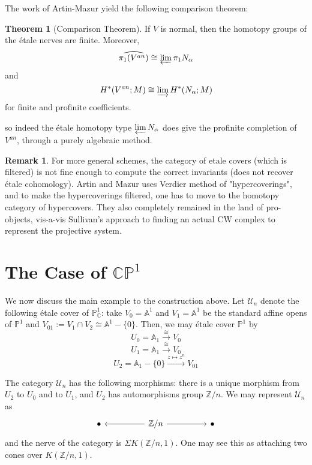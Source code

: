 \documentclass{article}
\theoremstyle{definition}
\newtheorem{theorem}{Theorem}[section]
\theoremstyle{definition}
\theoremstyle{definition}
\newtheorem{remark}{Remark}[theorem]
\theoremstyle{definition}
\theoremstyle{definition}
\theoremstyle{definition}
\theoremstyle{definition}
\begin{document}
The work of Artin-Mazur yield the following comparison theorem:

\begin{tcolorbox}[colback=red!5!white,colframe=red!30!white]
\begin{theorem}[Comparison Theorem]
If $V$ is normal, then the homotopy groups of the \'etale nerves are finite. Moreover,  
\[\widehat{\pi_1(V^{an})}\cong \varprojlim \pi_1{N_{\alpha}}\]
and 
\[H^*(V^{an};M)\cong \varinjlim H^*(N_{\alpha};M)\]
for finite and profinite coefficients.
\end{theorem}
\end{tcolorbox}
so indeed the \'etale homotopy type $\varprojlim N_{\alpha}$ does give the profinite completion of $V^{an}$, through a purely algebraic method. 



\begin{tcolorbox}[colback=green!5!white,colframe=green!30!white]
\begin{remark}
For more general schemes, the category of etale covers (which is filtered) is not fine enough to compute the correct invariants (does not recover \'etale cohomology). Artin and Mazur uses Verdier method of "hypercoverings", and to make the hypercoverings filtered, one has to move to the homotopy category of hypercovers. They also completely remained in the land of pro-objects, vis-a-vis Sullivan's approach to finding an actual CW complex to represent the projective system.
\end{remark}
\end{tcolorbox}

\section{The Case of $\mathbb{CP}^1$}
We now discuss the main example to the construction above. Let $\mathcal{U}_n$ denote the following \'etale cover of $\mathbb{P}^1_{\mathbb{C}}$: take $V_0=\mathbb{A}^1$ and $V_1=\mathbb{A}^1$ be the standard affine opens of $\mathbb{P}^1$ and $V_{01}:=V_1\cap V_2\cong \mathbb{A}^1-\{0\}$. Then, we may \'etale cover $\mathbb{P}^1$ by 
$$U_0=\mathbb{A}_1\xrightarrow{\cong }V_0$$
$$U_1=\mathbb{A}_1\xrightarrow{\cong }V_0$$
$$U_2=\mathbb{A}_1-\{0\}\xrightarrow{z\mapsto z^n }V_{01}$$

The category $\mathcal{U}_n$ has the following morphisms: there is a unique morphism from $U_2$ to $U_0$ and to $U_1$, and $U_2$ has automorphisms group $\mathbb{Z}/n$. We may represent  $\mathcal{U}_n$ as 
\[\begin{tikzcd}
	\bullet && {\mathbb{Z}/n} && \bullet
	\arrow[from=1-3, to=1-1]
	\arrow[from=1-3, to=1-5]
\end{tikzcd}\]
and the nerve of the category is $\Sigma K(\mathbb{Z}/n,1)$. One may see this as attaching two cones over $K(\mathbb{Z}/n,1)$. 
\end{document}
